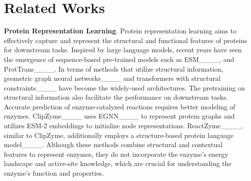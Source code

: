 \section{Related Works}








\textbf{Protein Representation Learning}. 
Protein representation learning aims to effectively capture and represent the structural and functional features of proteins for downstream tasks. Inspired by large language models, recent years have seen the emergence of sequence-based pre-trained models such as ESM____, and ProtTrans____. In terms of methods that utilize structural information, geometric graph neural networks____ and transformers with structural constraints____ have become the widely-used architectures. The pretraining on structural information also facilitate the performance on downstream tasks. Accurate prediction of enzyme-catalyzed reactions requires better modeling of enzymes. ClipZyme____ uses EGNN____ to represent protein graphs and utilizes ESM-2 embeddings to initialize node representations. ReactZyme____, similar to ClipZyme, additionally employs a structure-based protein language model____. Although these methods combine structural and contextual features to represent enzymes, they do not incorporate the enzyme’s energy landscape and active-site knowledge, which are crucial for understanding the enzyme’s function and properties.

